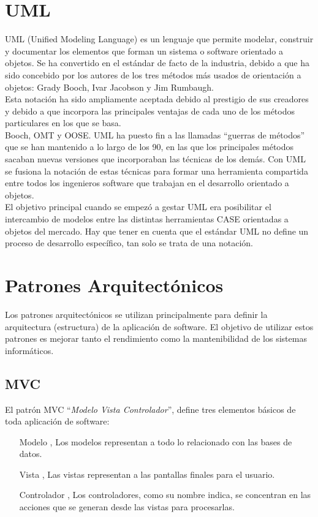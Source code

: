 \section{UML}
UML (Unified Modeling Language) es un lenguaje que permite modelar, construir y documentar los elementos que forman un sistema o software orientado a objetos. Se ha convertido en el est\'andar de facto de la industria, debido a que ha sido concebido por los autores de los tres m\'etodos m\'as usados de orientaci\'on a objetos: Grady Booch, Ivar Jacobson y Jim Rumbaugh.\\

Esta notaci\'on ha sido ampliamente aceptada debido al prestigio de sus creadores y debido a que incorpora las principales ventajas de cada uno de los m\'etodos particulares en los que se basa.\\

Booch, OMT y OOSE. UML ha puesto fin a las llamadas ``guerras de m\'etodos'' que se han mantenido a lo largo de los 90, en las que los principales m\'etodos sacaban nuevas versiones que incorporaban las t\'ecnicas de los dem\'as. Con UML se fusiona la notaci\'on de estas t\'ecnicas para formar una herramienta compartida entre todos los ingenieros software que trabajan en el desarrollo orientado a objetos.\\

El objetivo principal cuando se empez\'o a gestar UML era posibilitar el intercambio de modelos entre las distintas herramientas CASE orientadas a objetos del mercado. Hay que tener en cuenta que el est\'andar UML no define un proceso de desarrollo espec\'ifico, tan solo se trata de una notaci\'on. \cite{ing_soft}\\

\section{Patrones Arquitect\'onicos}
Los patrones arquitect\'onicos se utilizan principalmente para definir la arquitectura (estructura) de la aplicaci\'on de software. El objetivo de utilizar estos patrones es mejorar tanto el rendimiento como la mantenibilidad de los sistemas inform\'aticos\cite{design_patterns}.

\subsection{MVC}
El patr\'on MVC ``\emph{Modelo Vista Controlador}'', define tres elementos b\'asicos de toda aplicaci\'on de software:
\begin{itemize}
\item[Modelo], Los modelos representan a todo lo relacionado con las bases de datos.
\item[Vista], Las vistas representan a las pantallas finales para el usuario.
\item[Controlador], Los controladores, como su nombre indica, se concentran en las acciones que se generan desde las vistas para procesarlas.
\end{itemize}

